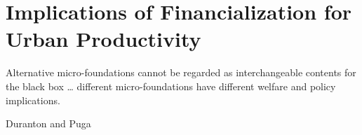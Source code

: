 


\chapter{Implications of Financialization for Urban Productivity} \label{chapter-tramsmission}%

\epigraph{Alternative micro-foundations cannot be regarded as interchangeable contents for the black box \dots %
different micro-foundations have different welfare and policy implications. %
}{Duranton and Puga \cite{durantonMicroFoundationsUrbanAgglomeration2004}}


